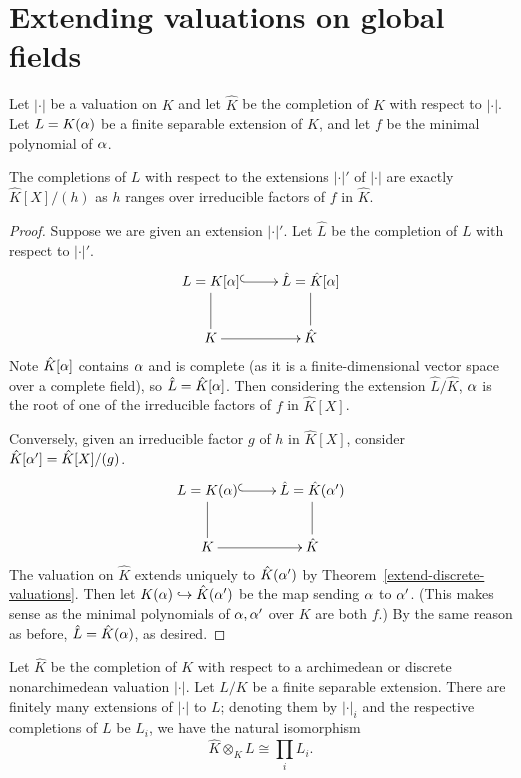 \section{Extending valuations on global fields}
\begin{thm}
Let $|\cdot|$ be a valuation on $K$ and let $\hat{K}$ be the completion of $K$ with respect to $|\cdot|$. Let $L=K(\alpha)$ be a finite separable extension of $K$, and let $f$ be the minimal polynomial of $\alpha$.

The completions of $L$ with respect to the extensions $|\cdot|'$ of $|\cdot|$ are exactly $\hat{K}[X]/(h)$ as $h$ ranges over irreducible factors of $f$ in $\hat{K}$.
\end{thm}
\begin{proof}
Suppose we are given an extension $|\cdot|'$. Let $\hat{L}$ be the completion of $L$ with respect to $|\cdot|'$.
\[
\xymatrix{
L=K[\al]\ar@{^(->}[r]\ar@{-}[d] & \hat L=\hat K[\al]\ar@{-}[d]\\
K\ar[r] & \hat{K}
}
\]
Note $\hat K[\alpha]$ contains $\alpha$ and is complete (as it is a finite-dimensional vector space over a complete field), so $\hat L=\hat K[\alpha]$. Then considering the extension $\hat L/\hat K$, $\alpha$ is the root of one of the irreducible factors of $f$ in $\hat K[X]$.

Conversely, given an irreducible factor $g$ of $h$ in $\hat K[X]$, consider $\hat K[\alpha']=\hat K[X]/(g)$. 
\[
\xymatrix{
L=K(\al)\ar@{^(->}[r]\ar@{-}[d] & \hat L=\hat K(\al')\ar@{-}[d]\\
K\ar[r] & \hat{K}
}
\]
The valuation on $\hat K$ extends uniquely to $\hat K(\alpha')$ by Theorem~\ref{extend-discrete-valuations}. Then let $K(\alpha)\hookrightarrow \hat K(\alpha')$ be the map sending $\alpha$ to $\alpha'$. (This makes sense as the minimal polynomials of $\alpha,\alpha'$ over $K$ are both $f$.) By the same reason as before, $\hat L=\hat K(\alpha)$, as desired.
\end{proof}
\begin{thm}
Let $\hat K$ be the completion of $K$ with respect to
a archimedean or discrete nonarchimedean valuation $|\cdot|$.
Let $L/K$ be a finite separable extension. There are finitely many extensions of $|\cdot|$ to $L$; denoting them by $|\cdot|_i$ and the respective completions of $L$ be $L_i$, we have the natural isomorphism
\[
\hat K\otimes_K L\cong\prod_{i} L_i.
\]
\end{thm}
